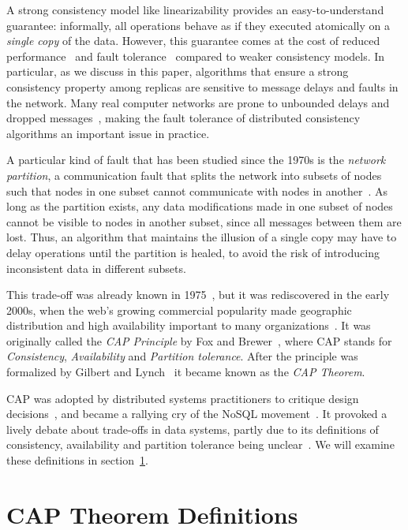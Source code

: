 \documentclass[a4paper,twocolumn,10pt]{article}
\begin{document}
A strong consistency model like linearizability provides an easy-to-understand guarantee:
informally, all operations behave as if they executed atomically on a \emph{single copy} of the
data. However, this guarantee comes at the cost of reduced performance~\cite{Attiya1994gw} and fault
tolerance~\cite{Davidson1985hv} compared to weaker consistency models. In particular, as we discuss
in this paper, algorithms that ensure a strong consistency property among replicas are sensitive to
message delays and faults in the network. Many real computer networks are prone to unbounded delays
and dropped messages~\cite{Bailis2014jx}, making the fault tolerance of distributed consistency
algorithms an important issue in practice.

A particular kind of fault that has been studied since the 1970s is the \emph{network partition}, a
communication fault that splits the network into subsets of nodes such that nodes in one subset
cannot communicate with nodes in another~\cite{Johnson1975we, Lindsay1979wv, Davidson1985hv}. As
long as the partition exists, any data modifications made in one subset of nodes cannot be visible
to nodes in another subset, since all messages between them are lost. Thus, an algorithm that
maintains the illusion of a single copy may have to delay operations until the partition is healed,
to avoid the risk of introducing inconsistent data in different subsets.

This trade-off was already known in 1975~\cite{Johnson1975we}, but it was rediscovered in the early
2000s, when the web's growing commercial popularity made geographic distribution and high
availability important to many organizations~\cite{Brewer2012tr}. It was originally called the
\emph{CAP Principle} by Fox and Brewer~\cite{Fox1999bs, Brewer2000vd}, where CAP stands for
\emph{Consistency}, \emph{Availability} and \emph{Partition tolerance}. After the principle was
formalized by Gilbert and Lynch~\cite{Gilbert2002il, Gilbert2012bf} it became known as the
\emph{CAP Theorem}.

CAP was adopted by distributed systems practitioners to critique design
decisions~\cite{Hodges2013tj}, and became a rallying cry of the NoSQL movement~\cite{Brewer2012ba}.
It provoked a lively debate about trade-offs in data systems, partly due to its definitions of
consistency, availability and partition tolerance being unclear~\cite{Robinson2010tp}. We will
examine these definitions in section~\ref{sec:definitions}.

\section{CAP Theorem Definitions}\label{sec:definitions}
\end{document}
